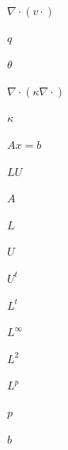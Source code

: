 \documentclass{article}
\begin{document}
$\nabla\cdot(v \cdot)$
\pagebreak

$q$
\pagebreak

$\theta$
\pagebreak

$\nabla\cdot(\kappa \nabla\cdot)$
\pagebreak

$\kappa$
\pagebreak

$A x = b$
\pagebreak

$LU$
\pagebreak

$A$
\pagebreak

$L$
\pagebreak

$U$
\pagebreak

$U^t$
\pagebreak

$L^t$
\pagebreak

$L^{\infty}$
\pagebreak

$L^{2}$
\pagebreak

$L^{p}$
\pagebreak

$p$
\pagebreak

$b$
\pagebreak
\end{document}
